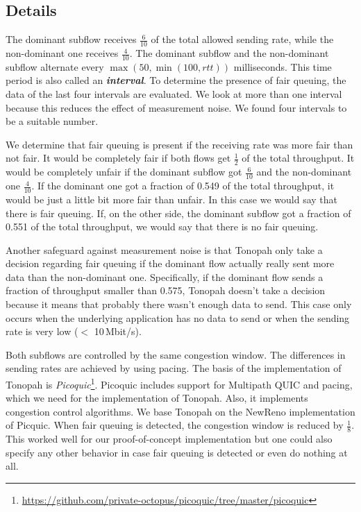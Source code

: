 \documentclass[conference]{IEEEtran}
\begin{document}
\subsection{Details}

The dominant subflow receives $\frac{6}{10}$ of the total allowed sending rate, while the non-dominant one receives $\frac{4}{10}$. 
The dominant subflow and the non-dominant subflow alternate every $\max{(50, \min{(100, \textit{rtt})})}$ milliseconds. 
This time period is also called an \textbf{\textit{interval}}. To determine the presence of fair queuing, the data of the last four intervals are evaluated. 
We look at more than one interval because this reduces the effect of measurement noise. We found four intervals to be a suitable number. 

We determine that fair queuing is present if the receiving rate was more fair than not fair. 
It would be completely fair if both flows get $\frac{1}{2}$ of the total throughput. It would be completely unfair if the dominant subflow got $\frac{6}{10}$ and the non-dominant one $\frac{4}{10}$. 
If the dominant one got a fraction of 0.549 of the total throughput, it would be just a little bit more fair than unfair. In this case we would say that there is fair queuing. 
If, on the other side, the dominant subflow got a fraction of 0.551 of the total throughput, we would say that there is no fair queuing. 

Another safeguard against measurement noise is that Tonopah only take a decision regarding fair queuing if the dominant flow actually really sent more data than the non-dominant one. 
Specifically, if the dominant flow sends a fraction of throughput smaller than 0.575, Tonopah doesn't take a decision because it means that probably there wasn't enough data to send. 
This case only occurs when the underlying application has no data to send or when the sending rate is very low ($<$ 10\,Mbit/s). 

Both subflows are controlled by the same congestion window. The differences in sending rates are achieved by using pacing. 
The basis of the implementation of Tonopah is \textit{Picoquic}\footnote{\url{https://github.com/private-octopus/picoquic/tree/master/picoquic}}. 
Picoquic includes support for Multipath QUIC and pacing, which we need for the implementation of Tonopah. Also, it implements congestion control algorithms. 
We base Tonopah on the NewReno implementation of Picquic. When fair queuing is detected, the congestion window is reduced by $\frac{1}{8}$. 
This worked well for our proof-of-concept implementation but one could also specify any other behavior in case fair queuing is detected or even do nothing at all. 
\end{document}
